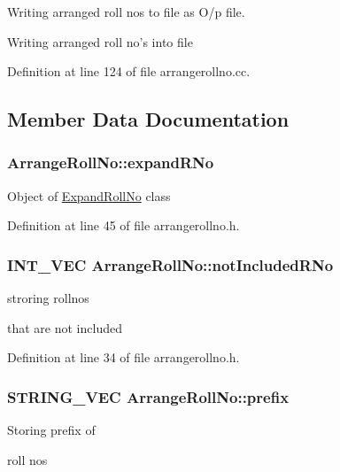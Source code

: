 Writing arranged roll nos to file as O/p file. 

Writing arranged roll no's into file 

Definition at line 124 of file arrangerollno.\-cc.



\subsection{Member Data Documentation}
\hypertarget{classArrangeRollNo_a7ddd59b57f85cf6fea265d38c284df92}{
\subsubsection[{expand\-R\-No}]{ Arrange\-Roll\-No\-::expand\-R\-No\hspace{0.3cm}{\ttfamily [protected]}}}\label{classArrangeRollNo_a7ddd59b57f85cf6fea265d38c284df92}
Object of \hyperlink{classExpandRollNo}{Expand\-Roll\-No} class 

Definition at line 45 of file arrangerollno.\-h.

\hypertarget{classArrangeRollNo_a1f6740950e3180731b74c3ecdc19b98c}{
\subsubsection[{not\-Included\-R\-No}]{\setlength{\rightskip}{0pt plus 5cm}I\-N\-T\-\_\-\-V\-E\-C Arrange\-Roll\-No\-::not\-Included\-R\-No\hspace{0.3cm}{\ttfamily [protected]}}}\label{classArrangeRollNo_a1f6740950e3180731b74c3ecdc19b98c}
\begin{DoxyVerb}                    stroring rollnos 
\end{DoxyVerb}
 that are not included 

Definition at line 34 of file arrangerollno.\-h.

\hypertarget{classArrangeRollNo_ac70b1f6e601cc5786ef339a38ae18c6f}{
\subsubsection[{prefix}]{\setlength{\rightskip}{0pt plus 5cm}S\-T\-R\-I\-N\-G\-\_\-\-V\-E\-C Arrange\-Roll\-No\-::prefix\hspace{0.3cm}{\ttfamily [protected]}}}\label{classArrangeRollNo_ac70b1f6e601cc5786ef339a38ae18c6f}
\begin{DoxyVerb}                           Storing prefix of 
\end{DoxyVerb}
 roll nos 

